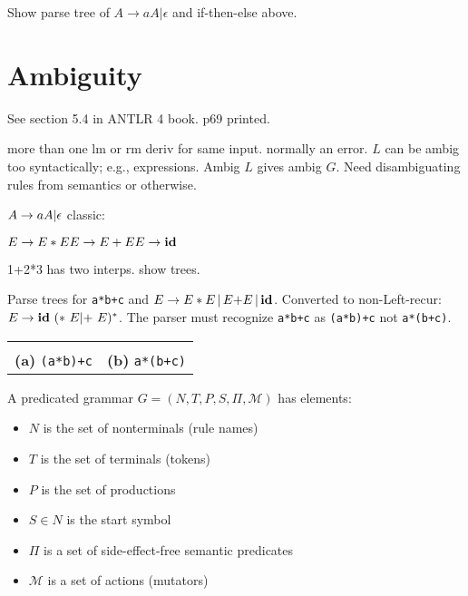 \documentclass[11pt,twocolumn,nocopyright]{sigplanconf}
\begin{document}
Show parse tree of  $A \rightarrow a A | \epsilon$ and if-then-else above.

\section{Ambiguity}

See section 5.4 in ANTLR 4 book. p69 printed.

more than one lm or rm deriv for same input. normally an error. $L$ can be ambig too syntactically; e.g., expressions. Ambig $L$ gives ambig $G$. Need disambiguating rules from semantics or otherwise.

\noindent $
A \rightarrow a A | \epsilon \\
$
classic:

\noindent $
E \rightarrow E * E\\
E \rightarrow E + E\\
E \rightarrow {\bf id}\\
$

1+2*3 has two interps. show trees.

Parse trees for {\tt a*b+c} and $E \rightarrow E * E \,|\, E {\bf +} E \,|\, {\bf id}$. Converted to non-Left-recur:  $E \rightarrow {\bf id}\ (*\ E | {\bf +}\ E)^*$. The parser must recognize {\tt a*b+c} as {\tt (a*b)+c} not {\tt a*(b+c)}.

\begin{center}
\begin{small}
\begin{tabular}{cc}
\scalebox{.9}{
\begin{tikzpicture}
\tikzset{level distance=25pt, sibling distance=-2pt}
\Tree
[.$E$
  1 * [.$\underline{E}$ 2 ] +  [.$E$ 3 ]]
]
\end{tikzpicture}
} & \scalebox{.9}{
\begin{tikzpicture}
\tikzset{level distance=25pt, sibling distance=-2pt}
\Tree
[.$E$
  1 *
  [.$\underline{E}$ 2 + [.$E$ 3 ]]
]
\end{tikzpicture}
} \\
{\bf (a)} {\tt (a*b)+c} & {\bf (b)} {\tt a*(b+c)} \\
\end{tabular}
\end{small}
\end{center}


A predicated grammar $G = (N, T, P, S, \Pi, \mathcal{M})$ has elements:

\begin{itemize}\itemsep0pt \parskip0pt 
\item $N$ is the set of nonterminals (rule names)
\item $T$ is the set of terminals (tokens)
\item $P$ is the set of productions
\item $S \in N$ is the start symbol
\item $\Pi$ is a set of side-effect-free semantic predicates
\item $\mathcal{M}$ is a set of actions (mutators) 
\end{itemize}
\end{document}
